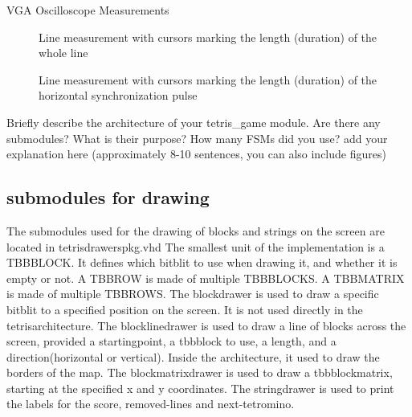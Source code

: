 \documentclass[10pt,a4paper,titlepage,oneside]{article}
\begin{document}
\maketitle



\begin{qa}{VGA Oscilloscope Measurements}

	\begin{figure}[h!]
		\centering
		\dummyimage
		\caption{Line measurement with cursors marking the length (duration) of the whole line}
	\end{figure}
	
	\begin{figure}[h!]
		\centering
		\dummyimage
		\caption{Line measurement with cursors marking the length (duration) of the horizontal synchronization pulse}
	\end{figure}
	

\end{qa}



\begin{qa}{Briefly describe the architecture of your \textsf{tetris\_game} module. Are there any submodules? What is their purpose? How many FSMs did you use?}
add your explanation here (approximately 8-10 sentences, you can also include figures) 
\end{qa}

\subsection{submodules for drawing}
The submodules used for the drawing of blocks and strings on the screen are located in tetrisdrawerspkg.vhd
The smallest unit of the implementation is a TBBBLOCK. It defines which bitblit to use when drawing it, and whether it is empty or not. 
A TBBROW is made of multiple TBBBLOCKS.
A TBBMATRIX is made of multiple TBBROWS. 
The blockdrawer is used to draw a specific bitblit to a specified position on the screen. It is not used directly in the tetrisarchitecture.
The blocklinedrawer is used to draw a line of blocks across the screen, provided a startingpoint, a tbbblock to use, a length, and a direction(horizontal or vertical).
Inside the architecture, it used to draw the borders of the map.
The blockmatrixdrawer is used to draw a tbbblockmatrix, starting at the specified x and y coordinates.
The stringdrawer is used to print the labels for the score, removed-lines and next-tetromino.   
\end{document}
